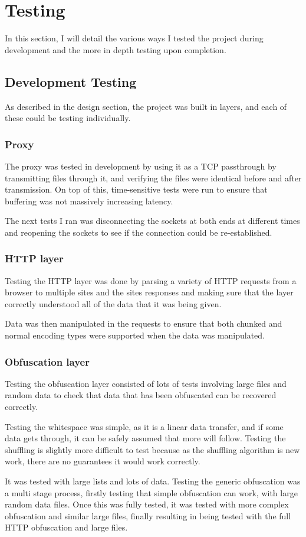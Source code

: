 \def\listingsfont{\ttfamily}
\section{Testing}
In this section, I will detail the various ways I tested the project during development and the more in depth testing upon completion.
\subsection{Development Testing}
As described in the design section, the project was built in layers, and each of these could be testing individually.
\subsubsection{Proxy}
The proxy was tested in development by using it as a TCP passthrough by transmitting files through it, and verifying the files were identical before and after transmission.
On top of this, time-sensitive tests were run to ensure that buffering was not massively increasing latency.\par
The next tests I ran was disconnecting the sockets at both ends at different times and reopening the sockets to see if the connection could be re-established.\par
\subsubsection{HTTP layer}
Testing the HTTP layer was done by parsing a variety of HTTP requests from a browser to multiple sites and the sites responses and making sure that the layer correctly understood all of the data that it was being given.\par
Data was then manipulated in the requests to ensure that both chunked and normal encoding types were supported when the data was manipulated.
\subsubsection{Obfuscation layer}
Testing the obfuscation layer consisted of lots of tests involving large files and random data to check that data that has been obfuscated can be recovered correctly.\par
Testing the whitespace was simple, as it is a linear data transfer, and if some data gets through, it can be safely assumed that more will follow.
Testing the shuffling is slightly more difficult to test because as the shuffling algorithm is new work, there are no guarantees it would work correctly.\par It was tested with large lists and lots of data.
Testing the generic obfuscation was a multi stage process, firstly testing that simple obfuscation can work, with large random data files. Once this was fully tested, it was tested with more complex obfuscation and similar large files, finally resulting in being tested with the full HTTP obfuscation and large files.
